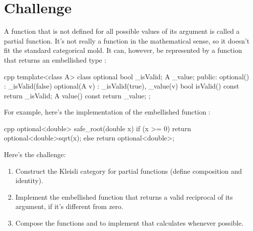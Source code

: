 \section{Challenge}

A function that is not defined for all possible values of its argument
is called a partial function. It's not really a function in the
mathematical sense, so it doesn't fit the standard categorical mold. It
can, however, be represented by a function that returns an embellished
type :

\begin{snip}{cpp}
template<class A> class optional {
    bool _isValid;
    A _value;
public: 
    optional()    : _isValid(false) {}
    optional(A v) : _isValid(true), _value(v) {}
    bool isValid() const { return _isValid; }
    A value() const { return _value; }
};
\end{snip}
For example, here's the implementation of the embellished function
:

\begin{snip}{cpp}
optional<double> safe_root(double x) {
    if (x >= 0) return optional<double>{sqrt(x)}; 
    else return optional<double>{};
}
\end{snip}
Here's the challenge:

\begin{enumerate}
  \tightlist
  \item
        Construct the Kleisli category for partial functions (define
        composition and identity).
  \item
        Implement the embellished function  that
        returns a valid reciprocal of its argument, if it's different from
        zero.
  \item
        Compose the functions  and  to implement
         that calculates 
        whenever possible.
\end{enumerate}
